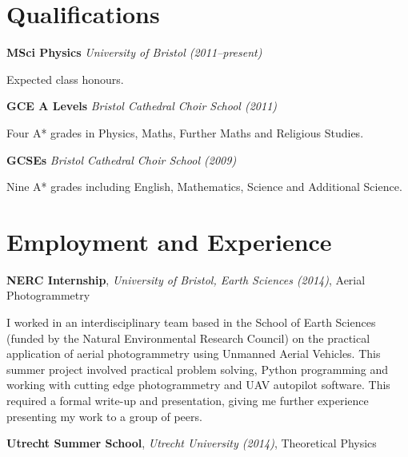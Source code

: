 \documentclass[11pt,a4paper,sans]{moderncv}
\begin{document}
\vspace*{-2.5\baselineskip}
\makecvtitle

\vspace*{-2\baselineskip}

\vspace{5pt}

\section{Qualifications}

{\large\textbf{MSci Physics} \textit{University of Bristol (2011--present)} }

Expected  class honours.

\vspace{1em}
{\large\textbf{GCE A Levels} \textit{Bristol Cathedral Choir School (2011)} }

Four A* grades in Physics, Maths, Further Maths and Religious Studies.

\vspace{1em}
{\large\textbf{GCSEs} \textit{Bristol Cathedral Choir School (2009)} }

Nine A* grades including English, Mathematics, Science and Additional Science.

\vspace{5pt}

\section{Employment and Experience}

\vspace{2pt}

{\large\textbf{NERC Internship}, \textit{University of Bristol, Earth Sciences
(2014)}, Aerial Photogrammetry}

I worked in an interdisciplinary team based in the School of Earth Sciences
(funded by the Natural Environmental Research Council) on the practical
application of aerial photogrammetry using Unmanned Aerial Vehicles. This summer
project involved practical problem solving, Python programming and working with
cutting edge photogrammetry and UAV autopilot software.  This required a formal
write-up and presentation, giving me further experience presenting my work to a
group of peers.

\vspace{1em}

{\large\textbf{Utrecht Summer School}, \textit{Utrecht University (2014)}, Theoretical
Physics}
\end{document}
